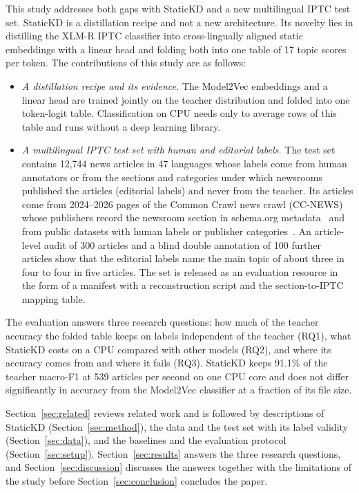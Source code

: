 \documentclass{ieeeaccess}
\begin{document}
This study addresses both gaps with StaticKD and a new multilingual IPTC test set. StaticKD is a distillation recipe and not a new architecture. Its novelty lies in distilling the XLM-R IPTC classifier into cross-lingually aligned static embeddings with a linear head and folding both into one table of 17 topic scores per token. The contributions of this study are as follows:
\begin{itemize}
  \item \emph{A distillation recipe and its evidence.} The Model2Vec embeddings and a linear head are trained jointly on the teacher distribution and folded into one token-logit table. Classification on CPU needs only to average rows of this table and runs without a deep learning library.
  \item \emph{A multilingual IPTC test set with human and editorial labels.} The test set contains 12,744 news articles in 47 languages whose labels come from human annotators or from the sections and categories under which newsrooms published the articles (editorial labels) and never from the teacher. Its articles come from 2024--2026 pages of the Common Crawl news crawl (CC-NEWS) whose publishers record the newsroom section in schema.org metadata~\cite{guha2016schema} and from public datasets with human labels or publisher categories~\cite{adelani2023masakhanews,petukhova2023mnds,mirashi2023indicnews,hossain2025banglanews,indonews2021}. An article-level audit of 300 articles and a blind double annotation of 100 further articles show that the editorial labels name the main topic of about three in four to four in five articles. The set is released as an evaluation resource in the form of a manifest with a reconstruction script and the section-to-IPTC mapping table.
\end{itemize}

The evaluation answers three research questions: how much of the teacher accuracy the folded table keeps on labels independent of the teacher (RQ1), what StaticKD costs on a CPU compared with other models (RQ2), and where its accuracy comes from and where it fails (RQ3). StaticKD keeps 91.1\% of the teacher macro-F1 at 539 articles per second on one CPU core and does not differ significantly in accuracy from the Model2Vec classifier at a fraction of its file size.

Section~\ref{sec:related} reviews related work and is followed by descriptions of StaticKD (Section~\ref{sec:method}), the data and the test set with its label validity (Section~\ref{sec:data}), and the baselines and the evaluation protocol (Section~\ref{sec:setup}). Section~\ref{sec:results} answers the three research questions, and Section~\ref{sec:discussion} discusses the answers together with the limitations of the study before Section~\ref{sec:conclusion} concludes the paper.
\end{document}

